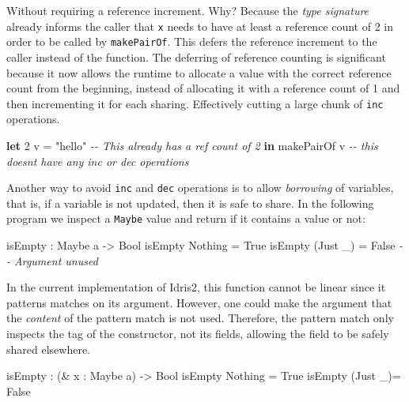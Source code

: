 \documentclass[
]{article}
\newenvironment{Shaded}{}{}
\newcommand{\CommentTok}[1]{\textcolor[rgb]{0.38,0.63,0.69}{\textit{#1}}}
\newcommand{\DataTypeTok}[1]{\textcolor[rgb]{0.56,0.13,0.00}{#1}}
\newcommand{\DecValTok}[1]{\textcolor[rgb]{0.25,0.63,0.44}{#1}}
\newcommand{\KeywordTok}[1]{\textcolor[rgb]{0.00,0.44,0.13}{\textbf{#1}}}
\newcommand{\NormalTok}[1]{#1}
\newcommand{\OperatorTok}[1]{\textcolor[rgb]{0.40,0.40,0.40}{#1}}
\newcommand{\OtherTok}[1]{\textcolor[rgb]{0.00,0.44,0.13}{#1}}
\newcommand{\StringTok}[1]{\textcolor[rgb]{0.25,0.44,0.63}{#1}}
\begin{document}
Without requiring a reference increment. Why? Because the \emph{type
signature} already informs the caller that \texttt{x} needs to have at
least a reference count of 2 in order to be called by
\texttt{makePairOf}. This defers the reference increment to the caller
instead of the function. The deferring of reference counting is
significant because it now allows the runtime to allocate a value with
the correct reference count from the beginning, instead of allocating it
with a reference count of 1 and then incrementing it for each sharing.
Effectively cutting a large chunk of \texttt{inc} operations.

\begin{Shaded}
\begin{Highlighting}[]
\KeywordTok{let} \DecValTok{2}\NormalTok{ v }\OtherTok{=} \StringTok{"hello"} \CommentTok{{-}{-} This already has a ref count of 2}
 \KeywordTok{in}\NormalTok{ makePairOf v }\CommentTok{{-}{-} this doesn\textquotesingle{}t have any inc or dec operations}
\end{Highlighting}
\end{Shaded}

Another way to avoid \texttt{inc} and \texttt{dec} operations is to
allow \emph{borrowing} of variables, that is, if a variable is not
updated, then it is safe to share. In the following program we inspect a
\texttt{Maybe} value and return if it contains a value or not:

\begin{Shaded}
\begin{Highlighting}[]
\NormalTok{isEmpty }\OperatorTok{:} \DataTypeTok{Maybe}\NormalTok{ a }\OtherTok{{-}\textgreater{}} \DataTypeTok{Bool}
\NormalTok{isEmpty }\DataTypeTok{Nothing} \OtherTok{=} \DataTypeTok{True}
\NormalTok{isEmpty (}\DataTypeTok{Just}\NormalTok{ \_) }\OtherTok{=} \DataTypeTok{False} \CommentTok{{-}{-} Argument unused}
\end{Highlighting}
\end{Shaded}

In the current implementation of Idris2, this function cannot be linear
since it patterns matches on its argument. However, one could make the
argument that the \emph{content} of the pattern match is not used.
Therefore, the pattern match only inspects the tag of the constructor,
not its fields, allowing the field to be safely shared elsewhere.

\begin{Shaded}
\begin{Highlighting}[]
\NormalTok{isEmpty }\OperatorTok{:}\NormalTok{ (}\OperatorTok{\&}\NormalTok{ x }\OperatorTok{:} \DataTypeTok{Maybe}\NormalTok{ a) }\OtherTok{{-}\textgreater{}} \DataTypeTok{Bool}
\NormalTok{isEmpty }\DataTypeTok{Nothing} \OtherTok{=} \DataTypeTok{True}
\NormalTok{isEmpty (}\DataTypeTok{Just}\NormalTok{ \_)}\OtherTok{=} \DataTypeTok{False}
\end{Highlighting}
\end{Shaded}
\end{document}
